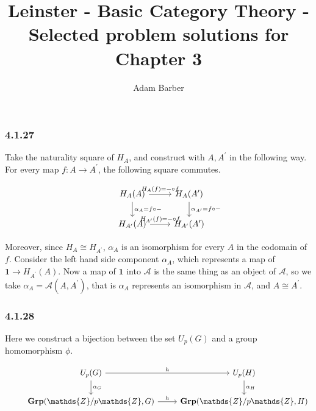 \documentclass{article}
\begin{document}
\title{Leinster - Basic Category Theory - Selected problem solutions for Chapter 3}
\author{Adam Barber}

\maketitle

\subsubsection*{4.1.27}

Take the naturality square of $H_A$, and construct with $A, A^\prime$ in the following way.
For every map $f: A \rightarrow A^\prime$, the following square commutes.

\begin{equation*}
\begin{tikzcd}
  & H_A(A) \arrow[d,"\alpha_A = f \circ \mathit{-}"] \arrow[r, "H_A(f) = \mathit{-} \circ f"] & H_A(A^\prime) \arrow[d,"\alpha_{A^\prime} = f \circ \mathit{-}"] \\
  & H_{A^\prime}(A) \arrow[r,"H_{A^\prime}(f) = \mathit{-} \circ f"] & H_{A^\prime}(A^\prime)
\end{tikzcd}
\end{equation*}

Moreover, since $H_A \cong H_{A^\prime}$,  $\alpha_A$ is an isomorphism for every $A$ in the codomain of $f$. Consider the left hand side component $\alpha_A$, which represents a map of $\mathbf{1} \rightarrow H_{A^\prime}(A)$. Now a map of $\mathbf{1}$ into $\mathcal{A}$ is the same thing as an object of $\mathcal{A}$, so we take $\alpha_A = \mathcal{A}(A,A^\prime)$, that is $\alpha_A$ represents an isomorphism in $\mathcal{A}$, and $A \cong A^\prime$.

\subsubsection*{4.1.28}

Here we construct a bijection between the set $U_p(G)$ and a group homomorphism $\phi$.

\begin{equation*}
\begin{tikzcd}
  & U_p(G) \arrow[d,"\alpha_G"] \arrow[r, "h"] & U_p(H) \arrow[d,"\alpha_{H}"] \\
  & \mathbf{Grp}(\mathds{Z}/p\mathds{Z}, G) \arrow[r,"h"] & \mathbf{Grp}(\mathds{Z}/p\mathds{Z}, H)
\end{tikzcd}
\end{equation*}
\end{document}
